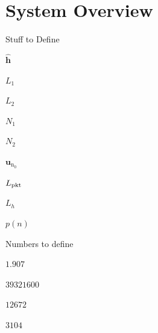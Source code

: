 

\chapter{System Overview}
\label{sec:systemOverview}

Stuff to Define

$\hat{\mathbf{h}}$

$L_1$

$L_2$

$N_1$

$N_2$

$\mathbf{u}_{\text{n}_0}$

$L_\text{pkt}$

$L_h$

$p(n)$

Numbers to define

$1.907$ 

$39321600$

$12672$

$3104$




